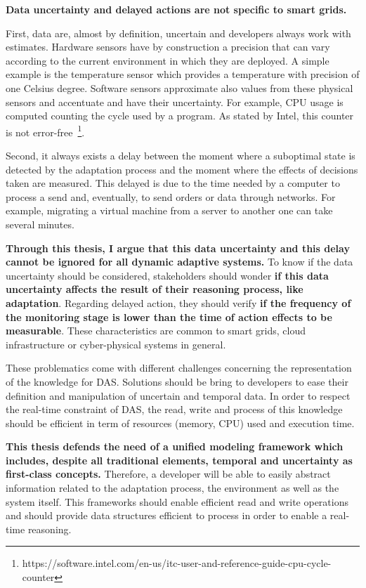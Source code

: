 \bigskip
{}
\textbf{Data uncertainty and delayed actions are not specific to smart grids.}

First, data are, almost by definition, uncertain and developers always work with estimates.
Hardware sensors have by construction a precision that can vary according to the current environment in which they are deployed.
A simple example is the temperature sensor which provides a temperature with precision of one Celsius degree.
Software sensors approximate also values from these physical sensors and accentuate and have their uncertainty.
For example, CPU usage is computed counting the cycle used by a program.
As stated by Intel, this counter is not error-free~\footnote{https://software.intel.com/en-us/itc-user-and-reference-guide-cpu-cycle-counter}.

Second, it always exists a delay between the moment where a suboptimal state is detected by the adaptation process and the moment where the effects of decisions taken are measured.
This delayed is due to the time needed by a computer to process a send and, eventually, to send orders or data through networks.
For example, migrating a virtual machine from a server to another one can take several minutes.

\textbf{Through this thesis, I argue that this data uncertainty and this delay cannot be ignored for all dynamic adaptive systems.}
To know if the data uncertainty should be considered, stakeholders should wonder \textbf{if this data uncertainty affects the result of their reasoning process, like adaptation}.
Regarding delayed action, they should verify \textbf{if the frequency of the monitoring stage is lower than the time of action effects to be measurable}.
These characteristics are common to smart grids, cloud infrastructure or cyber-physical systems in general.

\bigskip
{}
These problematics come with different challenges concerning the representation of the knowledge for DAS.
Solutions should be bring to developers to ease their definition and manipulation of uncertain and temporal data.
In order to respect the real-time constraint of DAS, the read, write and process of this knowledge should be efficient in term of resources (memory, CPU) used and execution time.

\bigskip
{}
\textbf{This thesis defends the need of a unified modeling framework which includes, despite all traditional elements, temporal and uncertainty as first-class concepts.}
Therefore, a developer will be able to easily abstract information related to the adaptation process, the environment as well as the system itself.
This frameworks should enable efficient read and write operations and should provide data structures efficient to process in order to enable a real-time reasoning.

